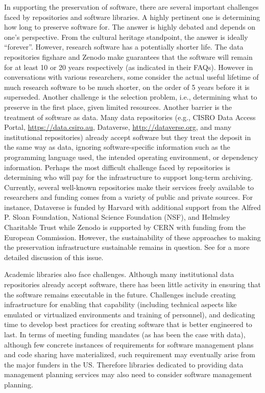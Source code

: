 \documentclass[letterpaper,11pt]{article}
\begin{document}
In supporting the preservation of software, there are several important challenges faced by repositories and software libraries. A highly pertinent one is determining how long to preserve software for. The answer is highly debated and depends on one's perspective. From the cultural heritage standpoint, the answer is ideally ``forever''. However, research software has a potentially shorter life. The data repositories figshare and Zenodo make guarantees that the software will remain for at least 10 or 20 years respectively (as indicated in their FAQs). However in conversations with various researchers, some consider the actual useful lifetime of much research software to be much shorter, on the order of 5 years before it is superseded.  Another challenge is the selection problem, i.e., determining what to preserve in the first place, given limited resources. Another barrier is the treatment of software as data. Many data repositories (e.g., CISRO Data Access Portal, \url{https://data.csiro.au}, Dataverse, \url{http://dataverse.org}, and many institutional repositories) already accept software but they treat the deposit in the same way as data, ignoring software-specific information such as the programming language used, the intended operating environment, or dependency information. Perhaps the most difficult challenge faced by repositories is determining who will pay for the infrastructure to support long-term archiving. Currently, several well-known repositories make their services freely available to researchers and funding comes from a variety of public and private sources. For instance, Dataverse is funded by Harvard with additional support from the Alfred P. Sloan Foundation, National Science Foundation (NSF), and Helmsley Charitable Trust while Zenodo is supported by CERN with funding from the European Commission. However, the sustainability of these approaches to making the preservation infrastructure sustainable remains in question. See \citep{bourne2015,berman2013} for a more detailed discussion of this issue.

Academic libraries also face challenges. Although many institutional data repositories already accept software, there has been little activity in ensuring that the software remains executable in the future. Challenges include creating infrastructure for enabling that capability (including technical aspects like emulated or virtualized environments and training of personnel), and dedicating time to develop best practices for creating software that is better engineered to last. In terms of meeting funding mandates (as has been the case with data), although few concrete instances of requirements for software management plans and code sharing have materialized, such requirement may eventually arise from the major funders in the US. Therefore libraries dedicated to providing data management planning services may also need to consider software management planning.
\end{document}
